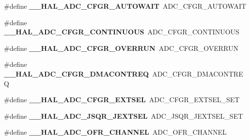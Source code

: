 \begin{DoxyCompactItemize}
\item 
\mbox{\label{group___h_a_l___a_d_c___aliased___macros_ga2b6be3d51e5b71511f3db77d6781fc85}} 
\#define {\bfseries \+\_\+\+\_\+\+H\+A\+L\+\_\+\+A\+D\+C\+\_\+\+C\+F\+G\+R\+\_\+\+A\+U\+T\+O\+W\+A\+IT}~A\+D\+C\+\_\+\+C\+F\+G\+R\+\_\+\+A\+U\+T\+O\+W\+A\+IT
\item 
\mbox{\label{group___h_a_l___a_d_c___aliased___macros_gab45f96be007a67f1251d47410b5c9618}} 
\#define {\bfseries \+\_\+\+\_\+\+H\+A\+L\+\_\+\+A\+D\+C\+\_\+\+C\+F\+G\+R\+\_\+\+C\+O\+N\+T\+I\+N\+U\+O\+US}~A\+D\+C\+\_\+\+C\+F\+G\+R\+\_\+\+C\+O\+N\+T\+I\+N\+U\+O\+US
\item 
\mbox{\label{group___h_a_l___a_d_c___aliased___macros_ga4312a4ed4373cdd0302434574aa0c8c9}} 
\#define {\bfseries \+\_\+\+\_\+\+H\+A\+L\+\_\+\+A\+D\+C\+\_\+\+C\+F\+G\+R\+\_\+\+O\+V\+E\+R\+R\+UN}~A\+D\+C\+\_\+\+C\+F\+G\+R\+\_\+\+O\+V\+E\+R\+R\+UN
\item 
\mbox{\label{group___h_a_l___a_d_c___aliased___macros_gaa80ebf8b334aa3e040d153ec06c880e2}} 
\#define {\bfseries \+\_\+\+\_\+\+H\+A\+L\+\_\+\+A\+D\+C\+\_\+\+C\+F\+G\+R\+\_\+\+D\+M\+A\+C\+O\+N\+T\+R\+EQ}~A\+D\+C\+\_\+\+C\+F\+G\+R\+\_\+\+D\+M\+A\+C\+O\+N\+T\+R\+EQ
\item 
\mbox{\label{group___h_a_l___a_d_c___aliased___macros_gacc58e207b5fcc238afb480a00997d167}} 
\#define {\bfseries \+\_\+\+\_\+\+H\+A\+L\+\_\+\+A\+D\+C\+\_\+\+C\+F\+G\+R\+\_\+\+E\+X\+T\+S\+EL}~A\+D\+C\+\_\+\+C\+F\+G\+R\+\_\+\+E\+X\+T\+S\+E\+L\+\_\+\+S\+ET
\item 
\mbox{\label{group___h_a_l___a_d_c___aliased___macros_ga362667abab4da4e626e45c9aef345d85}} 
\#define {\bfseries \+\_\+\+\_\+\+H\+A\+L\+\_\+\+A\+D\+C\+\_\+\+J\+S\+Q\+R\+\_\+\+J\+E\+X\+T\+S\+EL}~A\+D\+C\+\_\+\+J\+S\+Q\+R\+\_\+\+J\+E\+X\+T\+S\+E\+L\+\_\+\+S\+ET
\item 
\mbox{\label{group___h_a_l___a_d_c___aliased___macros_gad3ba77f5090921040fa9a63ff8d31241}} 
\#define {\bfseries \+\_\+\+\_\+\+H\+A\+L\+\_\+\+A\+D\+C\+\_\+\+O\+F\+R\+\_\+\+C\+H\+A\+N\+N\+EL}~A\+D\+C\+\_\+\+O\+F\+R\+\_\+\+C\+H\+A\+N\+N\+EL

\end{DoxyCompactItemize}
